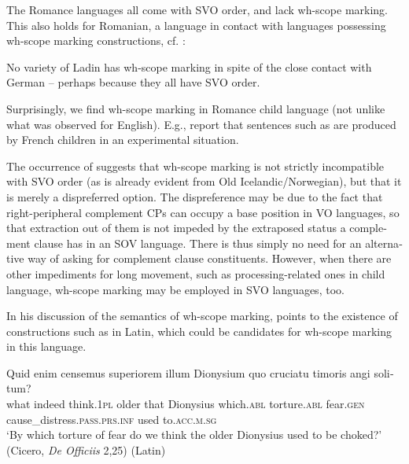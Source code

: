 \documentclass[output=paper,colorlinks,citecolor=brown]{langscibook}
\begin{document}
\begin{otherlanguage}{english}
The Romance languages all come with SVO order, and lack wh-scope marking. This also holds for Romanian, a language in contact with languages possessing wh-scope marking constructions, cf. :

    \label{ex:fanselow:9}
    \z

\noindent No variety of Ladin has wh-scope marking in spite of the close contact with German -- perhaps because they all have SVO order.


Surprisingly, we find wh-scope marking in Romance child language (not unlike what was observed for English). E.g., \citet{Jakubowicz-Strik2008} report that sentences such as   are produced by French children in an experimental situation.

    \label{ex:fanselow:10}
    \z

\noindent The occurrence of  suggests that wh-scope marking is not strictly incompatible with SVO order (as is already evident from Old Icelandic/Norwegian), but that it is merely a dispreferred option. The dispreference may be due to the fact that right-peripheral complement CPs can occupy a base position in VO languages, so that extraction out of them is not impeded by the extraposed status a complement clause has in an SOV language. There is thus simply no need for an alternative way of asking for complement clause constituents. However, when there are other impediments for long movement, such as processing-related ones in child language, wh-scope marking may be employed in SVO languages, too.

In his discussion of the semantics of wh-scope marking, \citet{Staudacher2000} points to the existence of constructions such as  in Latin, which could be candidates for wh-scope marking in this language.

\ea \label{ex:fanselow:11}
\gll  Quid 	enim 	censemus 	superiorem 	illum 	Dionysium 	quo 	cruciatu timoris 	angi 		solitum? \\
    what 	indeed 	think.\textsc{1pl} 	older 	that 	Dionysius  which.\textsc{abl} 	torture.\textsc{abl} 	
	fear.\textsc{gen} 	{cause\_distress.\textsc{pass}.\textsc{prs}.\textsc{inf}} {used to.\textsc{acc}.\textsc{m}.\textsc{sg}}
  \\
    \glt    ‘By which torture of fear do we think the older Dionysius used to be choked?' (Cicero, \textit{De Officiis} 2,25) \hfill (Latin)
    \z



\end{otherlanguage}
\end{document}

